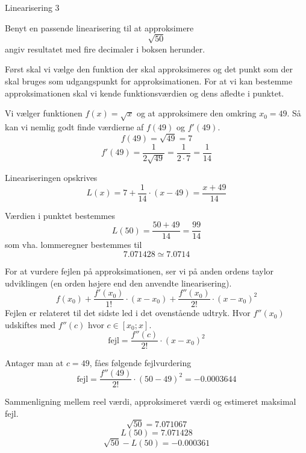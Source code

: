 \documentclass{article}
\begin{document}
\begin{exercise}{Linearisering 3}

Benyt en passende linearisering til at approksimere
\[
\sqrt{50}
\]
angiv resultatet med fire decimaler i boksen herunder.

\hint
Først skal vi vælge den funktion der skal approksimeres
og det punkt som der skal bruges som udgangspunkt for
approksimationen.
For at vi kan bestemme approksimationen skal vi
kende funktionsværdien og dens afledte i punktet.

\hint
Vi vælger funktionen $f(x) = \sqrt{x}$ og at approksimere den
omkring $x_0 = 49$.
Så kan vi nemlig godt finde værdierne af $f(49)$ og $f'(49)$.
\[
f(49) = \sqrt{49} = 7
\]
\[
f'(49) = \frac{1}{2 \sqrt{49}} = \frac{1}{2 \cdot 7 } = \frac{1}{14}
\]

\hint
Lineariseringen opskrives
\[
L(x) = 7 + \frac{1}{14} \cdot (x - 49) = \frac{x + 49}{14}
\]

\hint
Værdien i punktet bestemmes
\[
L(50) = \frac{50 + 49}{14} = \frac{99}{14}
\]
som vha. lommeregner bestemmes til
\[
7.071428 \simeq 7.0714
\]

\hint
For at vurdere fejlen på approksimationen, ser vi på anden
ordens taylor udviklingen (en orden højere end den
anvendte linearisering).
\[
f(x_0)
+ \frac{f'(x_0)}{1!} \cdot (x - x_0)
+ \frac{f''(x_0)}{2!} \cdot (x - x_0)^2
\]
Fejlen er relateret til det sidste led i det ovenstående udtryk.
Hvor $f''(x_0)$ udskiftes med $f''(c)$ hvor $c \in [x_0; x]$.
\[
\textrm{fejl} = \frac{f''(c)}{2!} \cdot (x - x_0)^2
\]

\hint
Antager man at $c = 49$, fåes følgende fejlvurdering
\[
\textrm{fejl} = \frac{f''(49)}{2!} \cdot (50 - 49)^2 =
-0.0003644\]

\hint
Sammenligning mellem reel værdi, approksimeret værdi og estimeret maksimal fejl.
\[
\sqrt{50}= 7.071067
\]
\[
L(50) = 7.071428
\]
\[
\sqrt{50} - L(50) = -0.000361
\]

\end{exercise}
\end{document}
